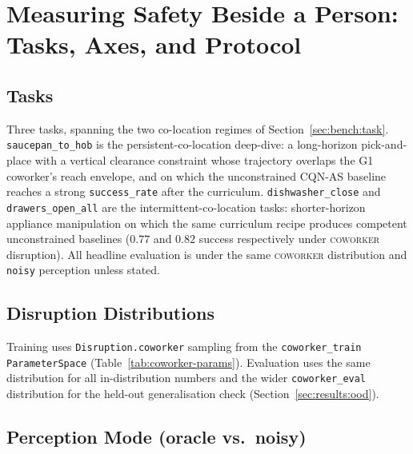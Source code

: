 \documentclass[11pt,a4paper]{report}
\newcommand{\cqnas}{CQN-AS}
\newcommand{\coworker}{\textsc{coworker}}
\begin{document}

\chapter{Measuring Safety Beside a Person: Tasks, Axes, and Protocol}
\label{ch:protocol}

\section{Tasks}
\label{sec:setup:tasks}

Three tasks, spanning the two co-location regimes of
Section~\ref{sec:bench:task}. \texttt{saucepan\_to\_hob} is the
persistent-co-location deep-dive: a long-horizon pick-and-place with
a vertical clearance constraint whose trajectory overlaps the G1
coworker's reach envelope, and on which the unconstrained \cqnas{}
baseline reaches a strong \texttt{success\_rate} after the
curriculum. \texttt{dishwasher\_close} and
\texttt{drawers\_open\_all} are the intermittent-co-location tasks:
shorter-horizon appliance manipulation on which the same curriculum
recipe produces competent unconstrained baselines ($0.77$ and $0.82$
success respectively under \coworker{} disruption). All headline
evaluation is under the same \coworker{} distribution and
\texttt{noisy} perception unless stated.

\section{Disruption Distributions}
\label{sec:setup:disruptions}

Training uses \texttt{Disruption.coworker} sampling from the
\texttt{coworker\_train} \texttt{ParameterSpace}
(Table~\ref{tab:coworker-params}). Evaluation uses the same
distribution for all in-distribution numbers and the wider
\texttt{coworker\_eval} distribution for the held-out generalisation
check (Section~\ref{sec:results:ood}).

\section{Perception Mode (oracle vs.\ noisy)}
\label{sec:setup:perception-mode}
\end{document}
